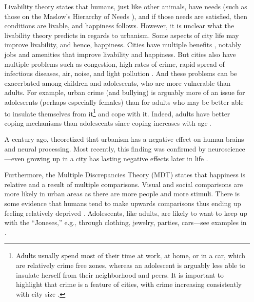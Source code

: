 \documentclass[10pt, letterpaper]{article}
\begin{document}
\begin{spacing}{1.4}
Livability theory \citep{veenhoven95,veenhoven14b,veenhoven00b} states that humans, just like other animals, have needs (such as those on the Maslow's Hierarchy of Needs \citep{maslow87}), and if those needs are satisfied, then conditions are livable, and happiness follows. 
However, it is unclear what the livability theory predicts in regards to urbanism. Some aspects of city life may improve livability, and hence, happiness. Cities have multiple benefits  \citep{meyer13,florida08,glaeser11,osullivan09}, notably jobs and amenities that improve livability and
 happiness. But cities also  have multiple problems such as congestion, high
 rates of crime, rapid spread of infectious diseases, air, noise, and light
 pollution 
   \citep{bettencourt10b,bettencourt07,meyer13,aokCityBook15,aok21}.
And these problems can be  exacerbated among children and adolescents, who are
more vulnerable than adults. For example, urban crime (and bullying) is arguably
more of an issue for adolescents (perhaps especially females) than for adults
who may be better able to insulate themselves from it\footnote{Adults usually
  spend most of their  time at work, at home, or in a car, which are relatively
  crime free zones, whereas an adolescent is arguably less able to insulate
  herself from their neighborhood and peers. It is important to highlight that
  crime is a feature of cities, with crime increasing consistently with city size \citep{blissCL_nov4_14,bettencourt13,bettencourt10,bettencourt10b,bettencourt07}.}
 and cope with it. Indeed,  adults have better coping mechanisms than adolescents since coping increases with age \citep{leipold2019coping}. 

A century ago, \cite{simmel03} theoretized that urbanism has a negative effect on human brains and neural processing. Most recently, this finding was confirmed by neuroscience---even growing up in a city has lasting negative effects later in life \citep{lederbogen11}. 
   
Furthermore, the Multiple Discrepancies Theory (MDT)
\citep{michalos85,michalos14c} states that happiness is relative and a result of
multiple comparisons. Visual and social comparisons are more likely in urban
areas as there are more people and more stimuli. There is some evidence that
humans tend to make upwards comparisons \citep{frey02s} thus ending up feeling
relatively deprived \citep[e.g.,][]{luttmer05,frank12}. Adolescents, like
adults, are likely to want to keep up with the ``Joneses,''  e.g., through clothing, jewelry, parties, cars---see examples in \citet{frank12}. 
 

\end{spacing}
\end{document}
